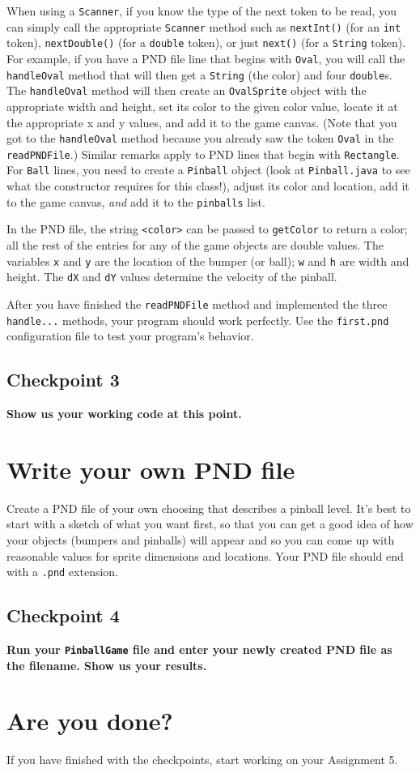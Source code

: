 \documentclass[12pt]{article}
\newcommand{\code}{\texttt}
\newcommand{\fname}{\texttt}
\begin{document}
When using a \verb'Scanner',
if you know the type of the next token to be read,
you can simply call the appropriate \verb'Scanner' method such as
\verb'nextInt()' (for an \verb'int' token),
\verb'nextDouble()' (for a \verb'double' token),
or just \verb'next()' (for a \verb'String' token).
For example, if you have a PND file line that begins with \verb'Oval',
you will call the \verb'handleOval'
method that will then get a \verb'String' (the color)
and four \verb'double's.
The \verb'handleOval' method will then
create an \verb'OvalSprite' object with the appropriate width and height,
set its color to the given color value,
locate it at the appropriate x and y values,
and add it to the game canvas.
(Note that you got to the \verb'handleOval' method
because you already saw the token \verb'Oval'
in the \verb'readPNDFile'.)
Similar remarks apply to PND lines that begin with \verb'Rectangle'.
For \verb'Ball' lines,
you need to create a \verb'Pinball' object
(look at \verb'Pinball.java' to see what the constructor requires
for this class!),
adjust its color and location,
add it to the game canvas,
{\em and} add it to the \verb'pinballs' list.

In the PND file, the string \code{<color>} can be passed to \code{getColor}
to return a color; all the rest of the entries
for any of the game objects are double values.
The variables \code{x} and \code{y} are the
location of the bumper (or ball);
\code{w} and \code{h} are width and height.
The \code{dX}
and \code{dY} values determine the velocity of the pinball.

After you have finished the \code{readPNDFile} method
and implemented the three \verb'handle...' methods,
your program should work perfectly.
Use the \fname{first.pnd} configuration file
to test your program's behavior.

\subsection*{Checkpoint 3}
{\bf
Show us your working code at this point.
}

\section*{Write your own PND file}
Create a PND file of your own choosing
that describes a pinball level.
It's best to start with a sketch of what you want first,
so that you can get a good idea of how your objects
(bumpers and pinballs) will appear
and so you can come up with reasonable values for
sprite dimensions and locations.
Your PND file should end with a \fname{.pnd} extension.

\subsection*{Checkpoint 4}
{\bf
Run your \verb'PinballGame' file
and enter your newly created PND file as the filename.
Show us your results.
}

\section*{Are you done?}
If you have finished with the checkpoints,
start working on your Assignment 5.
\end{document}
